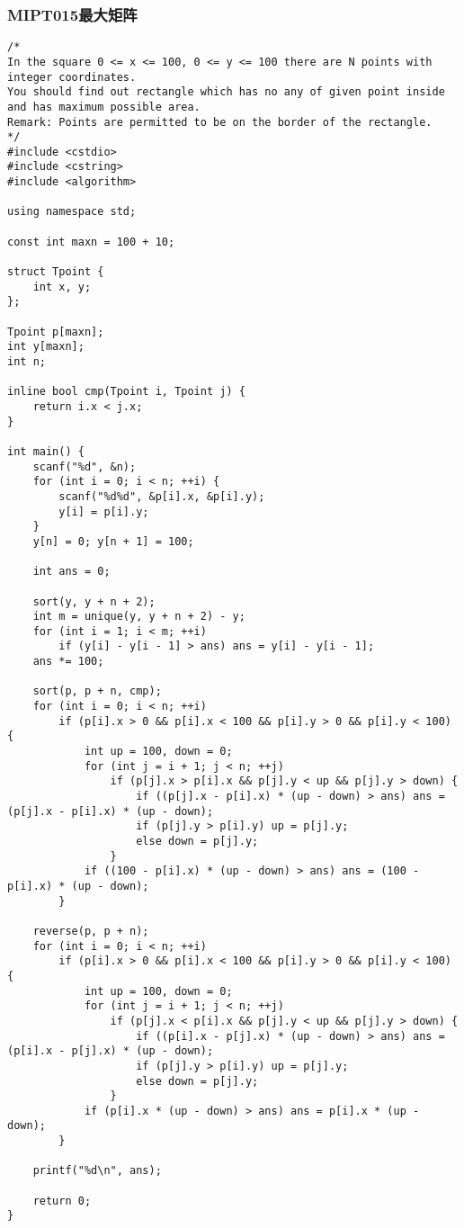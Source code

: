 \subsubsection{MIPT015最大矩阵}
\begin{verbatim}
/*
In the square 0 <= x <= 100, 0 <= y <= 100 there are N points with integer coordinates.
You should find out rectangle which has no any of given point inside and has maximum possible area.
Remark: Points are permitted to be on the border of the rectangle.
*/
#include <cstdio>
#include <cstring>
#include <algorithm>

using namespace std;

const int maxn = 100 + 10;

struct Tpoint {
    int x, y;
};

Tpoint p[maxn];
int y[maxn];
int n;

inline bool cmp(Tpoint i, Tpoint j) {
    return i.x < j.x;
}

int main() {
    scanf("%d", &n);
    for (int i = 0; i < n; ++i) {
        scanf("%d%d", &p[i].x, &p[i].y);
        y[i] = p[i].y;
    }
    y[n] = 0; y[n + 1] = 100;

    int ans = 0;

    sort(y, y + n + 2);
    int m = unique(y, y + n + 2) - y;
    for (int i = 1; i < m; ++i)
        if (y[i] - y[i - 1] > ans) ans = y[i] - y[i - 1];
    ans *= 100;

    sort(p, p + n, cmp);
    for (int i = 0; i < n; ++i)
        if (p[i].x > 0 && p[i].x < 100 && p[i].y > 0 && p[i].y < 100) {
            int up = 100, down = 0;
            for (int j = i + 1; j < n; ++j)
                if (p[j].x > p[i].x && p[j].y < up && p[j].y > down) {
                    if ((p[j].x - p[i].x) * (up - down) > ans) ans = (p[j].x - p[i].x) * (up - down);
                    if (p[j].y > p[i].y) up = p[j].y;
                    else down = p[j].y;
                }
            if ((100 - p[i].x) * (up - down) > ans) ans = (100 - p[i].x) * (up - down);
        }

    reverse(p, p + n);
    for (int i = 0; i < n; ++i)
        if (p[i].x > 0 && p[i].x < 100 && p[i].y > 0 && p[i].y < 100) {
            int up = 100, down = 0;
            for (int j = i + 1; j < n; ++j)
                if (p[j].x < p[i].x && p[j].y < up && p[j].y > down) {
                    if ((p[i].x - p[j].x) * (up - down) > ans) ans = (p[i].x - p[j].x) * (up - down);
                    if (p[j].y > p[i].y) up = p[j].y;
                    else down = p[j].y;
                }
            if (p[i].x * (up - down) > ans) ans = p[i].x * (up - down);
        }

    printf("%d\n", ans);

    return 0;
}
\end{verbatim}
